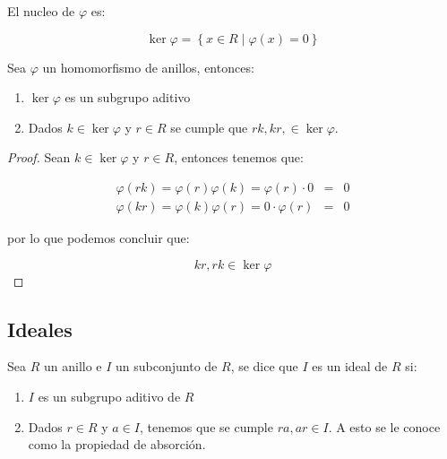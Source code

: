         \begin{definicion}
            El nucleo de $\varphi$ es:

            \begin{equation}
                \ker{\varphi} = \left\{ x \in R \mid \varphi(x) = 0 \right\}
            \end{equation}
        \end{definicion}

        \begin{proposicion}
            Sea $\varphi$ un homomorfismo de anillos, entonces:

            \begin{enumerate}
                \item $\ker{\varphi}$ es un subgrupo aditivo
                \item Dados $k \in \ker{\varphi}$ y $r \in R$ se cumple que $rk, kr, \in \ker{\varphi}$.
            \end{enumerate}
        \end{proposicion}

        \begin{proof}
            Sean $k \in \ker{\varphi}$ y $r \in R$, entonces tenemos que:

            \begin{eqnarray*}
                \varphi(rk) = \varphi(r) \varphi(k) = \varphi(r) \cdot 0 & = & 0 \\
                \varphi(kr) = \varphi(k) \varphi(r) = 0 \cdot \varphi(r) & = & 0
            \end{eqnarray*}

            por lo que podemos concluir que:

            \begin{equation*}
                kr, rk \in \ker{\varphi}
            \end{equation*}
        \end{proof}


    \subsection{Ideales}

        \begin{definicion}
            Sea $R$ un anillo e $I$ un subconjunto de $R$, se dice que $I$ es un ideal de $R$ si:

            \begin{enumerate}
                \item $I$ es un subgrupo aditivo de $R$
                \item Dados $r \in R$ y $a \in I$, tenemos que se cumple $ra, ar \in I$. A esto se le conoce como la propiedad de absorción.
            \end{enumerate}
        \end{definicion}

